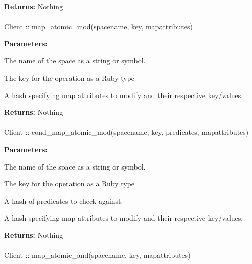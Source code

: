 \noindent\textbf{Returns:}
Nothing

\paragraph{}
\begin{ccode}
Client :: map_atomic_mod(spacename, key, mapattributes)
\end{ccode}
\funcdesc 

\noindent\textbf{Parameters:}
\begin{description}[labelindent=\widthof{{mapattributes}},leftmargin=*,noitemsep,nolistsep,align=right]
\item[spacename] The name of the space as a string or symbol.
\item[key] The key for the operation as a Ruby type
\item[mapattributes] A hash specifying map attributes to modify and their respective key/values.
\end{description}

\noindent\textbf{Returns:}
Nothing

\paragraph{}
\begin{ccode}
Client :: cond_map_atomic_mod(spacename, key, predicates, mapattributes)
\end{ccode}
\funcdesc 

\noindent\textbf{Parameters:}
\begin{description}[labelindent=\widthof{{mapattributes}},leftmargin=*,noitemsep,nolistsep,align=right]
\item[spacename] The name of the space as a string or symbol.
\item[key] The key for the operation as a Ruby type
\item[predicates] A hash of predicates to check against.
\item[mapattributes] A hash specifying map attributes to modify and their respective key/values.
\end{description}

\noindent\textbf{Returns:}
Nothing

\paragraph{}
\begin{ccode}
Client :: map_atomic_and(spacename, key, mapattributes)
\end{ccode}
\funcdesc 

